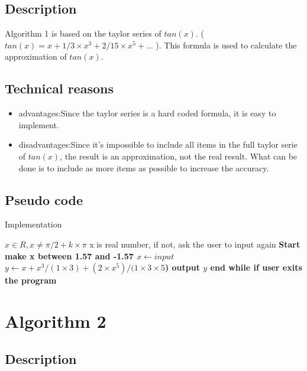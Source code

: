 \documentclass[10pt,a4paper,twoside]{article}
\begin{document}
\subsection{Description}

Algorithm 1 is based on the taylor series of $tan(x)$. ($tan(x) = x + 1/3\times x^3 +2/15 \times x^5 + ...$
). This formula is used to calculate the approximation of $tan(x)$.

\subsection{Technical reasons}

\begin{itemize}
    \item advantages:Since the taylor series is a hard coded formula, it is easy to implement. 
    \item disadvantages:Since it's impossible to include all items in the full taylor serie of $tan(x)$, the result is an approximation, not the real result. What can be done is to include as more items as possible to increase the accuracy.
\end{itemize}

\subsection{Pseudo code}
\begin{algorithm}
\caption{Implementation}\label{alg:cap}
\begin{algorithmic}
\Require $x \in R, x\neq \pi/2 +k\times\pi$
\Ensure x is real number, if not, ask the user to input again
\State \bf{Start}
\State make x between 1.57 and -1.57
    \State $x \gets input$
    \State $y \gets x+x^3/(1\times3)+(2\times x^5)/(1\times3\times5$)
    \State \bf{output} $y$
\State end while if user exits the program
\EndWhile
\end{algorithmic}
\end{algorithm}




\section{Algorithm 2}
\subsection{Description}
\end{document}
